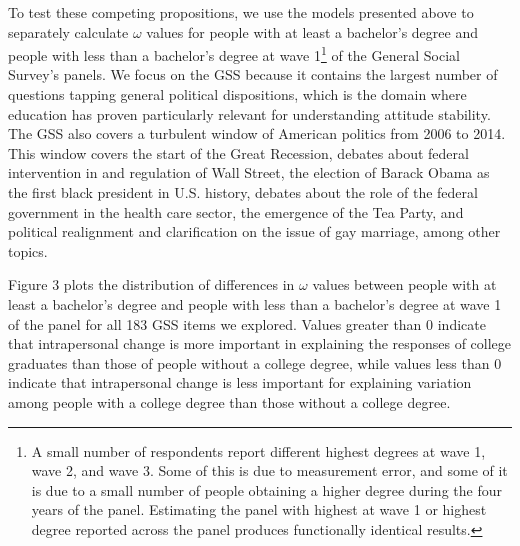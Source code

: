 \documentclass[
  12pt,
]{article}
\begin{document}
To test these competing propositions, we use the models presented above
to separately calculate \(\omega\) values for people with at least a
bachelor's degree and people with less than a bachelor's degree at wave
1\footnote{A small number of respondents report different highest
  degrees at wave 1, wave 2, and wave 3. Some of this is due to
  measurement error, and some of it is due to a small number of people
  obtaining a higher degree during the four years of the panel.
  Estimating the panel with highest at wave 1 or highest degree reported
  across the panel produces functionally identical results.} of the
General Social Survey's panels. We focus on the GSS because it contains
the largest number of questions tapping general political dispositions,
which is the domain where education has proven particularly relevant for
understanding attitude stability. The GSS also covers a turbulent window
of American politics from 2006 to 2014. This window covers the start of
the Great Recession, debates about federal intervention in and
regulation of Wall Street, the election of Barack Obama as the first
black president in U.S. history, debates about the role of the federal
government in the health care sector, the emergence of the Tea Party,
and political realignment and clarification on the issue of gay
marriage, among other topics.

Figure 3 plots the distribution of differences in \(\omega\) values
between people with at least a bachelor's degree and people with less
than a bachelor's degree at wave 1 of the panel for all 183 GSS items we
explored. Values greater than 0 indicate that intrapersonal change is
more important in explaining the responses of college graduates than
those of people without a college degree, while values less than 0
indicate that intrapersonal change is less important for explaining
variation among people with a college degree than those without a
college degree.
\end{document}
